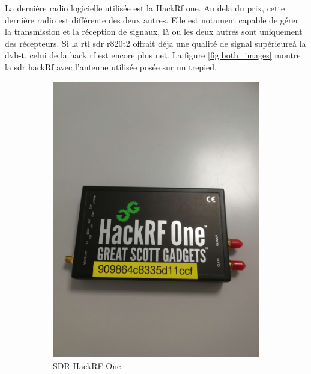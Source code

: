 La dernière radio logicielle utilisée est la HackRf one. Au dela du prix, cette dernière radio est différente des deux autres. Elle est notament capable de gérer la transmission et la réception de signaux, là ou les deux autres sont uniquement des récepteurs. Si la rtl sdr r820t2 offrait déja une qualité de signal supérieureà la dvb-t, celui de la hack rf est encore plus net. La figure \ref{fig:both_images} montre la sdr hackRf avec l'antenne utilisée posée sur un trepied.

\begin{figure}[h]
\centering
\begin{subfigure}{0.4\textwidth}
  \centering
  \includegraphics[width=\textwidth]{images/hackrf.png}
  \caption{SDR HackRF One}
  \label{term330}
\end{subfigure}
\hspace{0.5cm} %
\begin{subfigure}{0.4\textwidth}

\end{subfigure}
\end{figure}
